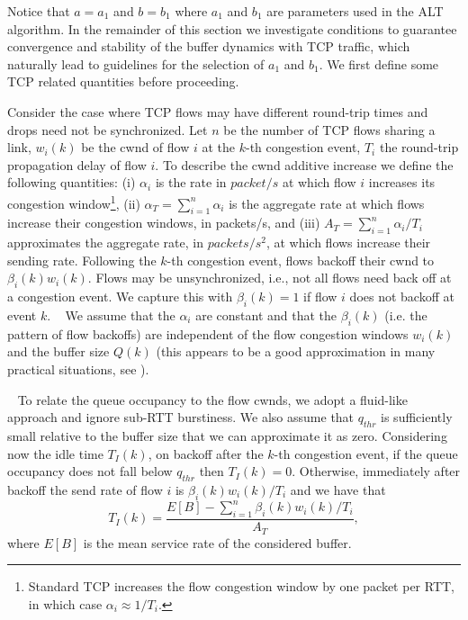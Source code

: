 \documentclass[10pt,twocolumn, journal]{IEEEtran}
\def\DLaddition#1{\noindent\ {\color{black} #1}}
\begin{document}
Notice that $a=a_1$ and $b=b_1$ where $a_1$ and $b_1$ are parameters used in the ALT
algorithm. In the remainder of this section we
investigate conditions to guarantee convergence and stability of the buffer dynamics with
TCP traffic, which naturally lead to guidelines for the selection of $a_1$ and $b_1$. We
first define some TCP related quantities before proceeding.

Consider the case where TCP flows may have different round-trip times and drops need not
be synchronized. Let $n$ be the number of TCP flows sharing a link, $w_i(k)$ be the cwnd
of flow $i$ at the $k$-th congestion event, $T_i$ the round-trip propagation delay of
flow $i$. To describe the cwnd additive increase we define the following quantities: (i)
$\alpha_i$ is the rate in $packet/s$ at which flow $i$ increases its congestion
window\footnote{Standard TCP increases the flow congestion window by one packet per RTT,
in which case $\alpha_i \approx 1/T_i$.}, (ii) $\alpha_T=\sum_{i=1}^n\alpha_i$ is the
aggregate rate at which flows increase their congestion windows, in packets/s, and (iii)
$A_T=\sum_{i=1}^n\alpha_i/T_i$ approximates the aggregate rate, in $packets/s^2$, at
which flows increase their sending rate.   Following the $k$-th congestion event, flows
backoff their cwnd to $\beta_i(k)w_i(k)$. Flows may be unsynchronized, i.e., not all
flows need back off at a congestion event. We capture this with $\beta_i(k)=1$ if flow
$i$ does not backoff at event $k$. \DLaddition{We assume that the $\alpha_i$ are constant and that the $\beta_i(k)$ (i.e. the pattern of flow backoffs) are independent of the flow congestion windows $w_i(k)$ and the buffer size $Q(k)$ (this appears to be a good approximation in many practical situations, see \cite{shorten_ton_2006}).  }

\DLaddition{To relate the queue occupancy to the flow cwnds, we adopt a fluid-like approach and ignore sub-RTT burstiness.   We also assume that $q_{thr}$ is sufficiently small relative to the buffer size that we can approximate it as zero.    Considering now the idle time $T_I(k)$, on backoff after the $k$-th congestion event, if the queue occupancy does not fall below $q_{thr}$ then $T_I(k)=0$.  Otherwise, immediately after backoff the send rate of flow $i$ is $\beta_i(k)w_i(k)/T_i$ and we have that}
\begin{equation}
T_I(k)=\frac{E[B]-\sum_{i=1}^n \beta_i(k)w_i(k)/T_i}{A_T},
\end{equation} where $E[B]$ is the mean service rate of the considered
buffer.
\end{document}

